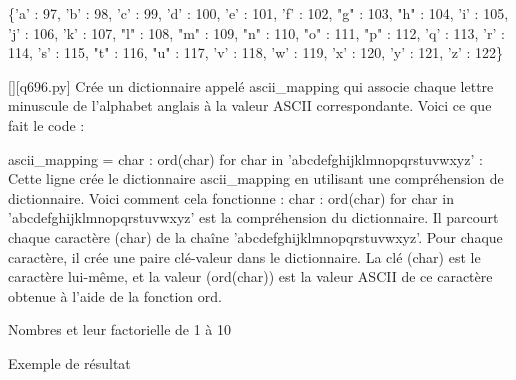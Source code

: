 \{'a' : 97, 'b' : 98, 'c' : 99, 'd' : 100, 'e' : 101, 'f' : 102, "g" : 103, "h" : 104, 'i' : 105, 'j' : 106, 'k' : 107, "l" : 108, "m" : 109, "n" : 110, "o" : 111, "p" : 112, 'q' : 113, 'r' : 114, 's' : 115, "t" : 116, "u" : 117, 'v' : 118, 'w' : 119, 'x' : 120, 'y' : 121, 'z' : 122\}
        \par
        \begin{solution}
            \renewcommand{\nomfichier}{q696.py}
            \pythonfile{\chemincode \nomfichier}[][\nomfichier]
            Crée un dictionnaire appelé ascii_mapping qui associe chaque lettre minuscule de l'alphabet anglais à la valeur ASCII correspondante. Voici ce que fait le code :

    ascii_mapping = {char : ord(char) for char in 'abcdefghijklmnopqrstuvwxyz'} : Cette ligne crée le dictionnaire ascii_mapping en utilisant une compréhension de dictionnaire. Voici comment cela fonctionne :
        {char : ord(char) for char in 'abcdefghijklmnopqrstuvwxyz'} est la compréhension du dictionnaire. Il parcourt chaque caractère (char) de la chaîne 'abcdefghijklmnopqrstuvwxyz'.
        Pour chaque caractère, il crée une paire clé-valeur dans le dictionnaire. La clé (char) est le caractère lui-même, et la valeur (ord(char)) est la valeur ASCII de ce caractère obtenue à l'aide de la fonction ord.
        \end{solution}
        

        \question
        Nombres et leur factorielle de 1 à 10

Exemple de résultat


